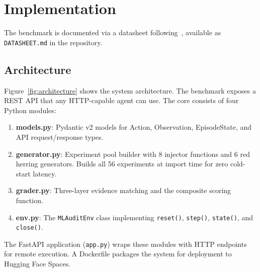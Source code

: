 \documentclass{article}
\begin{document}
\section{Implementation}
\label{sec:implementation}

The benchmark is documented via a datasheet following~\citet{gebru2021datasheets},
available as \texttt{DATASHEET.md} in the repository.

\subsection{Architecture}

Figure~\ref{fig:architecture} shows the system architecture.
The benchmark exposes a REST API that any HTTP-capable agent can use.
The core consists of four Python modules:

\begin{enumerate}[nosep]
  \item \textbf{models.py}: Pydantic v2 models for Action, Observation,
        EpisodeState, and API request/response types.
  \item \textbf{generator.py}: Experiment pool builder with 8 injector
        functions and 6 red herring generators.  Builds all 56 experiments
        at import time for zero cold-start latency.
  \item \textbf{grader.py}: Three-layer evidence matching and the
        composite scoring function.
  \item \textbf{env.py}: The \texttt{MLAuditEnv} class implementing
        \texttt{reset()}, \texttt{step()}, \texttt{state()}, and
        \texttt{close()}.
\end{enumerate}

The FastAPI application (\texttt{app.py}) wraps these modules with HTTP
endpoints for remote execution.  A Dockerfile packages the system for
deployment to Hugging Face Spaces.
\end{document}
